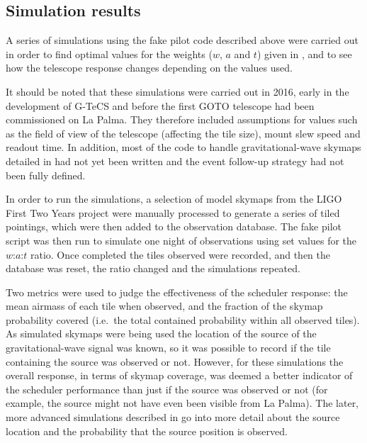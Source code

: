 \subsection{Simulation results}
\label{sec:scheduler_sim_results}
\begin{colsection}

A series of simulations using the fake pilot code described above were carried out in order to find optimal values for the weights ($w$, $a$ and $t$) given in , and to see how the telescope response changes depending on the values used.

It should be noted that these simulations were carried out in 2016, early in the development of G-TeCS and before the first GOTO telescope had been commissioned on La Palma. They therefore included assumptions for values such as the field of view of the telescope (affecting the tile size), mount slew speed and readout time. In addition, most of the code to handle gravitational-wave skymaps detailed in  had not yet been written and the event follow-up strategy had not been fully defined.

In order to run the simulations, a selection of model skymaps from the LIGO First Two Years project \citep{First2Years} were manually processed to generate a series of tiled pointings, which were then added to the observation database. The fake pilot script was then run to simulate one night of observations using set values for the $w$:$a$:$t$ ratio. Once completed the tiles observed were recorded, and then the database was reset, the ratio changed and the simulations repeated.

Two metrics were used to judge the effectiveness of the scheduler response: the mean airmass of each tile when observed, and the fraction of the skymap probability covered (i.e.\ the total contained probability within all observed tiles). As simulated skymaps were being used the location of the source of the gravitational-wave signal was known, so it was possible to record if the tile containing the source was observed or not. However, for these simulations the overall response, in terms of skymap coverage, was deemed a better indicator of the scheduler performance than just if the source was observed or not (for example, the source might not have even been visible from La Palma). The later, more advanced simulations described in  go into more detail about the source location and the probability that the source position is observed.

\newpage

\end{colsection}

